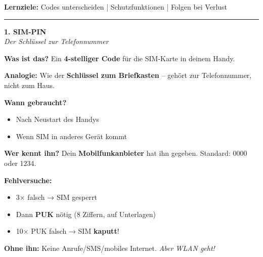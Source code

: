 \documentclass[a4paper,landscape,11pt]{article}
\begin{document}

 \hfill
{\footnotesize\textbf{Lernziele:} Codes unterscheiden | Schutzfunktionen | Folgen bei Verlust}

\vspace{1mm}
\hrule
\vspace{1mm}

\begin{minipage}[t]{0.32\linewidth}
\begin{center}
\colorbox{simblue!10}{%
\begin{minipage}{0.95\linewidth}
\vspace{2mm}
\begin{center}
{\Large\bfseries\textcolor{simblue}{1. SIM-PIN}}\\[1pt]
{\footnotesize\itshape Der Schlüssel zur Telefonnummer}
\end{center}
\vspace{2mm}
\end{minipage}%
}
\end{center}

\vspace{1mm}

\textbf{Was ist das?} Ein \textbf{4-stelliger Code} für die SIM-Karte in deinem Handy.

\textbf{Analogie:} Wie der \textbf{Schlüssel zum Briefkasten} -- gehört zur Telefonnummer, nicht zum Haus.

\textbf{Wann gebraucht?}
\begin{itemize}
\item Nach Neustart des Handys
\item Wenn SIM in anderes Gerät kommt
\end{itemize}

\textbf{Wer kennt ihn?} Dein \textbf{Mobilfunkanbieter} hat ihn gegeben. Standard: 0000 oder 1234.

\textbf{Fehlversuche:}
\begin{itemize}
\item 3× falsch → SIM gesperrt
\item Dann \textbf{PUK} nötig (8 Ziffern, auf Unterlagen)
\item 10× PUK falsch → SIM \textbf{kaputt}!
\end{itemize}

\textbf{Ohne ihn:} Keine Anrufe/SMS/mobiles Internet. \textit{Aber WLAN geht!}

\end{minipage}%
\end{document}
